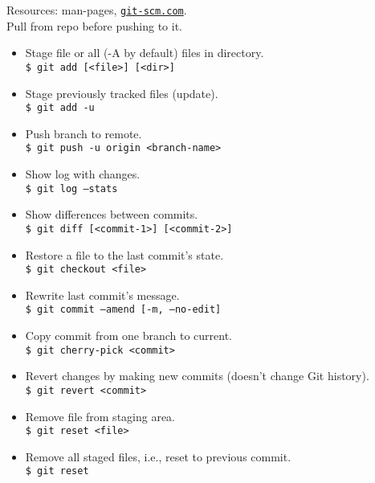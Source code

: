 Resources: man-pages, {\tt\href{www.git-scm.com}{git-scm.com}}.\\
Pull from repo before pushing to it.

\begin{itemize}[label={-}, leftmargin=*]

\item Stage file or all (-A by default) files in directory.\\
{\tt \$ git add [<file>] [<dir>]}

\item Stage previously tracked files (update).\\
{\tt \$ git add -u}

\item Push branch to remote.\\
{\tt \$ git push -u origin <branch-name>}

\hr

\item Show log with changes.\\
{\tt \$ git log --stats}

\item Show differences between commits.\\
{\tt \$ git diff [<commit-1>] [<commit-2>]}

\hr

\item Restore a file to the last commit's state.\\
{\tt \$ git checkout <file>}

\item Rewrite last commit's message.\\
{\tt \$ git commit --amend [-m, --no-edit]}

\item Copy commit from one branch to current.\\
{\tt \$ git cherry-pick <commit>}

\hr 

\item Revert changes by making new commits (doesn't change Git history).\\
{\tt \$ git revert <commit>}

\item Remove file from staging area.\\
{\tt \$ git reset <file>}

\item Remove all staged files, i.e., reset to previous commit.\\
{\tt \$ git reset}


\end{itemize}
